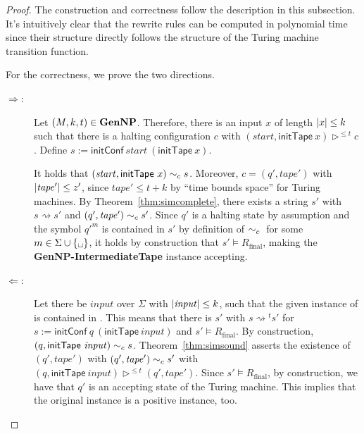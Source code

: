 \documentclass[a4paper,UKenglish,cleveref, autoref]{lipics-v2019}
\newcommand{\strent}{\rightsquigarrow}
\newcommand{\Rfinal}{R_{\text{final}}}
\begin{document}
\begin{proof}
  The construction and correctness follow the description in this subsection. 
  It's intuitively clear that the rewrite rules can be computed in polynomial time since their structure directly follows the structure of the Turing machine transition function. 

  For the correctness, we prove the two directions. 
  \begin{description}
    \item[$\Rightarrow$:]
      Let $(M, k, t) \in \textbf{GenNP}{}$. Therefore, there is an input $x$ of length $|x| \le k$ such that there is a halting configuration $c$ with $(\mathit{start}, \textsf{initTape}~x) \rhd^{\le t} c$. Define $s := \textsf{initConf}~\mathit{start}~(\textsf{initTape}~x)$.  

      It holds that $(\mathit{start}, \textsf{initTape}~x) \sim_c{} s$. 
      Moreover, $c = (q', \mathit{tape}')$ with $|\mathit{tape}'| \le z'$, since $\mathit{tape}' \le t + k$ by ``time bounds space'' for Turing machines. By Theorem~\ref{thm:simcomplete}, there exists a string $s'$ with $s \strent{} s'$ and $(q', \mathit{tape}') \sim_c{} s'$. Since $q'$ is a halting state by assumption and the symbol ${q'}^m$ is contained in $s'$ by definition of $\sim_c{}$ for some $m \in \Sigma \cup \{\blank\}$, it holds by construction that $s' \models \Rfinal$, making the \textbf{GenNP-IntermediateTape} instance accepting.

    \item[$\Leftarrow$:]
      Let there be $\mathit{input}$ over $\Sigma$ with $|\mathit{input}| \le k$, such that the given instance of \strconrew{} is contained in \strconrew{}. This means that there is $s'$ with $s \strent{}^t s'$ for $s := \textsf{initConf}~q~(\textsf{initTape}~\mathit{input})$ and $s' \models \Rfinal$.  
      By construction, $(q, \textsf{initTape}~\mathit{input}) \sim_c{} s$. Theorem~\ref{thm:simsound} asserts the existence of $(q', \mathit{tape}')$ with $(q', \mathit{tape}') \sim_c{} s'$ with $(q, \textsf{initTape}~\mathit{input}) \rhd^{\le t} (q', \mathit{tape}')$. Since $s' \models \Rfinal$, by construction, we have that $q'$ is an accepting state of the Turing machine. This implies that the original \gennp{} instance is a positive instance, too.
  \end{description}
\end{proof}
\end{document}
